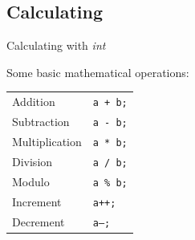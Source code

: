 \subsection{Calculating}

\begin{frame}{Calculating with \emph{int}}

	Some basic mathematical operations:
	\begin{tabular}{ll}
		Addition & \texttt{a + b;} \\
		Subtraction & \texttt{a - b;} \\
		Multiplication &\texttt{a * b;} \\
		Division & \texttt{a / b;} \\
		Modulo & \texttt{a \% b;} \\
		Increment & \texttt{a++;} \\
		Decrement & \texttt{a--;} \\
	\end{tabular}
\end{frame}

